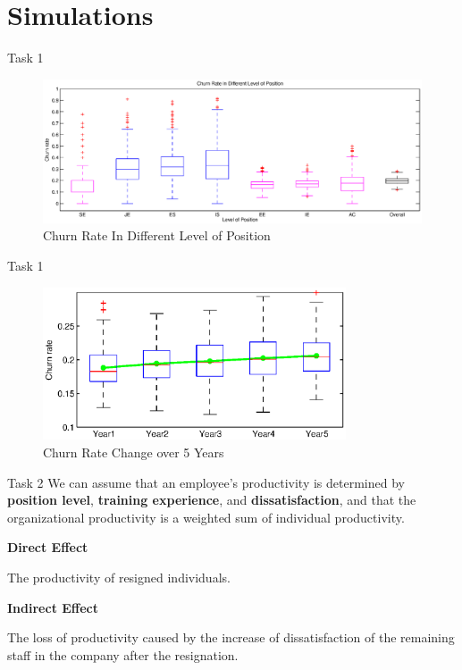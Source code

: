\documentclass{beamer}
\begin{document}
\section{Simulations}
\begin{frame}{Task 1}

\begin{figure}
\centering
\includegraphics[width=\textwidth]{fig/task-1-1.eps}
\caption{Churn Rate In Different Level of Position}
\end{figure}

\end{frame}

\begin{frame}{Task 1}
\begin{figure}
\centering
\includegraphics[width=0.8\textwidth]{fig/task-1-2.eps}
\caption{Churn Rate Change over 5 Years}
\end{figure}
\end{frame}

\begin{frame}{Task 2}
We can assume that an employee's productivity is determined by \textbf{position level}, \textbf{training experience}, and \textbf{dissatisfaction}, and that the organizational productivity is a weighted sum of individual productivity. \\\vspace{0.5em}

\textbf{Direct Effect}

The productivity of resigned individuals. \vspace{0.5em}

\textbf{Indirect Effect}

The loss of productivity caused by the increase of dissatisfaction of the remaining staff in the company after the resignation.


\end{frame}
\end{document}
